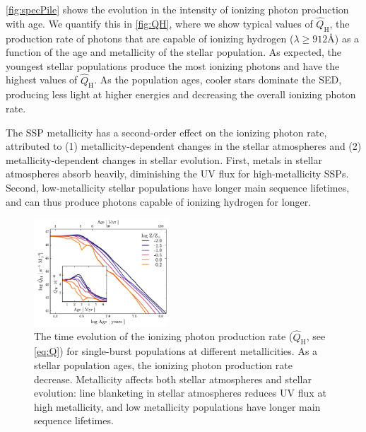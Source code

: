 \documentclass[twocolumn, tighten]{aastex61}
\newcommand{\Fig}[1]{\autoref{fig:#1}}
\newcommand{\Eq}[1]{\autoref{eq:#1}}
\newcommand\lam[1]{\ensuremath{\lambda #1}}
\newcommand{\ang}{\ensuremath{\mbox{\AA}}}
\newcommand{\QHat}{\ensuremath{\hat{Q}_{\mathrm{H}}}}
\begin{document}
\Fig{specPile} shows the evolution in the intensity of ionizing photon production with age. We quantify this in \Fig{QH}, where we show typical values of \QHat{}, the production rate of photons that are capable of ionizing hydrogen ($\lam \geq 912 \ang$) as a function of the age and metallicity of the stellar population. As expected, the youngest stellar populations produce the most ionizing photons and have the highest values of \QHat{}. As the population ages, cooler stars dominate the SED, producing less light at higher energies and decreasing the overall ionizing photon rate.

The SSP metallicity has a second-order effect on the ionizing photon rate, attributed to (1) metallicity-dependent changes in the stellar atmospheres and (2) metallicity-dependent changes in stellar evolution. First, metals in stellar atmospheres absorb heavily, diminishing the UV flux for high-metallicity SSPs. Second, low-metallicity stellar populations have longer main sequence lifetimes, and can thus produce photons capable of ionizing hydrogen for longer.

\begin{figure}
  \begin{centering}
    \includegraphics[width=0.45\textwidth]{f2.pdf}
    \caption{The time evolution of the ionizing photon production rate (\QHat{}, see \Eq{Q}) for single-burst populations at different metallicities. As a stellar population ages, the ionizing photon production rate decrease. Metallicity affects both stellar atmospheres and stellar evolution: line blanketing in stellar atmospheres reduces UV flux at high metallicity, and low metallicity populations have longer main sequence lifetimes.}
    \label{fig:QH}
  \end{centering}
\end{figure}
\end{document}
